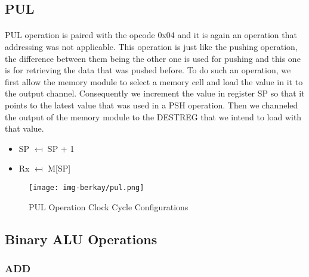 \documentclass{article}
\begin{document}
\subsection{PUL}
\paragraph{}
PUL operation is paired with the opcode 0x04 and it is again an operation that addressing was not applicable. This operation is just like the pushing operation, the difference between them being the other one is used for pushing and this one is for retrieving the data that was pushed before. To do such an operation, we first allow the memory module to select a memory cell and load the value in it to the output channel. Consequently we increment the value in register SP so that it points to the latest value that was used in a PSH operation. Then we channeled the output of the memory module to the DESTREG that we intend to load with that value.
\begin{itemize}
       \item SP $\mapsfrom$ SP + 1
       \item Rx $\mapsfrom$ M[SP]
\end{itemize}
\begin{figure}[h]
    \centering
    \texttt{[image: img-berkay/pul.png]}
    \caption{PUL Operation Clock Cycle Configurations}
    \label{fig:my_label}
\end{figure}
\newpage

\subsection{Binary ALU Operations}
\subsubsection{ADD}
\end{document}
